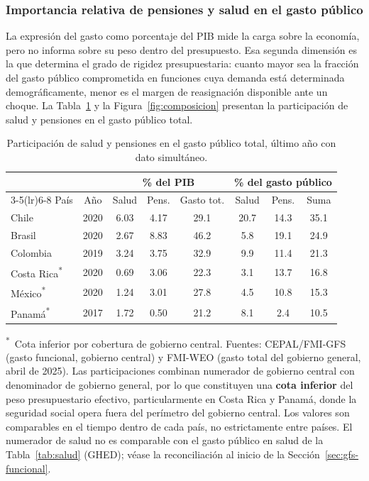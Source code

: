 \documentclass[12pt, letterpaper]{article}
\begin{document}
\subsubsection{Importancia relativa de pensiones y salud en el gasto público}
\label{sec:composicion}

La expresión del gasto como porcentaje del PIB mide la carga sobre la economía, pero no informa sobre su peso dentro del presupuesto. Esa segunda dimensión es la que determina el grado de rigidez presupuestaria: cuanto mayor sea la fracción del gasto público
comprometida en funciones cuya demanda está determinada demográficamente, menor es el margen de reasignación disponible ante un choque. La Tabla~\ref{tab:composicion} y la
Figura~\ref{fig:composicion} presentan la participación de salud y pensiones en el gasto
público total.

\begin{table}[htbp]
  \centering
  \caption{Participación de salud y pensiones en el gasto público total,
  último año con dato simultáneo.}
  \label{tab:composicion}
  \begin{tabular}{lccccccc}
    \toprule
    & & \multicolumn{3}{c}{\% del PIB} & \multicolumn{3}{c}{\% del gasto público} \\
    \cmidrule(lr){3-5}\cmidrule(lr){6-8}
    País & Año & Salud & Pens. & Gasto tot. & Salud & Pens. & Suma \\
    \midrule
    Chile      & 2020 & 6.03 & 4.17 & 29.1 & 20.7 & 14.3 & 35.1 \\
    Brasil     & 2020 & 2.67 & 8.83 & 46.2 & 5.8  & 19.1 & 24.9 \\
    Colombia   & 2019 & 3.24 & 3.75 & 32.9 & 9.9  & 11.4 & 21.3 \\
    Costa Rica\textsuperscript{*} & 2020 & 0.69 & 3.06 & 22.3 & 3.1  & 13.7 & 16.8 \\
    México\textsuperscript{*}     & 2020 & 1.24 & 3.01 & 27.8 & 4.5  & 10.8 & 15.3 \\
    Panamá\textsuperscript{*}     & 2017 & 1.72 & 0.50 & 21.2 & 8.1  & 2.4  & 10.5 \\
    \bottomrule
  \end{tabular}

  \vspace{2pt}
  \footnotesize
  \textsuperscript{*}~Cota inferior por cobertura de gobierno central.
  Fuentes: CEPAL/FMI-GFS (gasto funcional, gobierno central) y FMI-WEO
  (gasto total del gobierno general, abril de 2025). Las participaciones combinan
  numerador de gobierno central con denominador de gobierno general, por lo que
  constituyen una \textbf{cota inferior} del peso presupuestario efectivo,
  particularmente en Costa Rica y Panamá, donde la seguridad social opera fuera del
  perímetro del gobierno central. Los valores son comparables en el tiempo dentro de
  cada país, no estrictamente entre países. El numerador de salud no es comparable
  con el gasto público en salud de la Tabla~\ref{tab:salud} (GHED); véase la
  reconciliación al inicio de la Sección~\ref{sec:gfs-funcional}.
\end{table}
\end{document}
